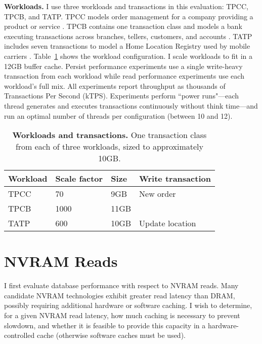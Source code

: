 \textbf{Workloads.}
I use three workloads and transactions in this evaluation: TPCC, TPCB, and TATP.
TPCC models order management for a company providing a product or service \cite{TPCC}.
TPCB contains one transaction class and models a bank executing transactions across branches, tellers, customers, and accounts \cite{TPCB}.
TATP includes seven transactions to model a Home Location Registry used by mobile carriers \cite{TATP}.
Table~\ref{table::Workloads} shows the workload configuration.
I scale workloads to fit in a 12GB buffer cache.
Persist performance experiments use a single write-heavy transaction from each workload while read performance experiments use each workload's full mix.
All experiments report throughput as thousands of Transactions Per Second (kTPS).
Experiments perform ``power runs"---each thread generates and executes transactions continuously without think time---and run an optimal number of threads per configuration (between 10 and 12).

\begin{table}
  \centering
  \begin{tabular}{l l l l}
    \hline
    Workload & Scale factor & Size & Write transaction \\
    \hline \hline
    TPCC & 70 & 9GB & New order \\
    TPCB & 1000 & 11GB & \\
    TATP & 600 & 10GB & Update location \\
    \hline
  \end{tabular}
  \caption{\textbf{Workloads and transactions.}  One transaction class from each of three workloads, sized to approximately 10GB.}
  \label{table::Workloads}
\end{table}

\section{NVRAM Reads}
\label{sec:OLTP_eval:Reads}

I first evaluate database performance with respect to NVRAM reads.
Many candidate NVRAM technologies exhibit greater read latency than DRAM, possibly requiring additional hardware or software caching.
I wish to determine, for a given NVRAM read latency, how much caching is necessary to prevent slowdown, and whether it is feasible to provide this capacity in a hardware-controlled cache (otherwise software caches must be used).

